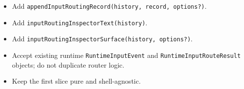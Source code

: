 \begin{itemize}
\tightlist
\item
  Add \texttt{a\allowbreak{}p\allowbreak{}p\allowbreak{}e\allowbreak{}n\allowbreak{}d\allowbreak{}I\allowbreak{}n\allowbreak{}p\allowbreak{}u\allowbreak{}t\allowbreak{}R\allowbreak{}o\allowbreak{}u\allowbreak{}t\allowbreak{}i\allowbreak{}n\allowbreak{}g\allowbreak{}R\allowbreak{}e\allowbreak{}c\allowbreak{}o\allowbreak{}r\allowbreak{}d\allowbreak{}(\allowbreak{}h\allowbreak{}i\allowbreak{}s\allowbreak{}t\allowbreak{}o\allowbreak{}r\allowbreak{}y\allowbreak{},\allowbreak{} \allowbreak{}r\allowbreak{}e\allowbreak{}c\allowbreak{}o\allowbreak{}r\allowbreak{}d\allowbreak{},\allowbreak{} \allowbreak{}o\allowbreak{}p\allowbreak{}t\allowbreak{}i\allowbreak{}o\allowbreak{}n\allowbreak{}s\allowbreak{}?\allowbreak{})}.
\item
  Add \texttt{i\allowbreak{}n\allowbreak{}p\allowbreak{}u\allowbreak{}t\allowbreak{}R\allowbreak{}o\allowbreak{}u\allowbreak{}t\allowbreak{}i\allowbreak{}n\allowbreak{}g\allowbreak{}I\allowbreak{}n\allowbreak{}s\allowbreak{}p\allowbreak{}e\allowbreak{}c\allowbreak{}t\allowbreak{}o\allowbreak{}r\allowbreak{}T\allowbreak{}e\allowbreak{}x\allowbreak{}t\allowbreak{}(\allowbreak{}h\allowbreak{}i\allowbreak{}s\allowbreak{}t\allowbreak{}o\allowbreak{}r\allowbreak{}y\allowbreak{})}.
\item
  Add \texttt{i\allowbreak{}n\allowbreak{}p\allowbreak{}u\allowbreak{}t\allowbreak{}R\allowbreak{}o\allowbreak{}u\allowbreak{}t\allowbreak{}i\allowbreak{}n\allowbreak{}g\allowbreak{}I\allowbreak{}n\allowbreak{}s\allowbreak{}p\allowbreak{}e\allowbreak{}c\allowbreak{}t\allowbreak{}o\allowbreak{}r\allowbreak{}S\allowbreak{}u\allowbreak{}r\allowbreak{}f\allowbreak{}a\allowbreak{}c\allowbreak{}e\allowbreak{}(\allowbreak{}h\allowbreak{}i\allowbreak{}s\allowbreak{}t\allowbreak{}o\allowbreak{}r\allowbreak{}y\allowbreak{},\allowbreak{} \allowbreak{}o\allowbreak{}p\allowbreak{}t\allowbreak{}i\allowbreak{}o\allowbreak{}n\allowbreak{}s\allowbreak{}?\allowbreak{})}.
\item
  Accept existing runtime \texttt{R\allowbreak{}u\allowbreak{}n\allowbreak{}t\allowbreak{}i\allowbreak{}m\allowbreak{}e\allowbreak{}I\allowbreak{}n\allowbreak{}p\allowbreak{}u\allowbreak{}t\allowbreak{}E\allowbreak{}v\allowbreak{}e\allowbreak{}n\allowbreak{}t} and \texttt{R\allowbreak{}u\allowbreak{}n\allowbreak{}t\allowbreak{}i\allowbreak{}m\allowbreak{}e\allowbreak{}I\allowbreak{}n\allowbreak{}p\allowbreak{}u\allowbreak{}t\allowbreak{}R\allowbreak{}o\allowbreak{}u\allowbreak{}t\allowbreak{}e\allowbreak{}R\allowbreak{}e\allowbreak{}s\allowbreak{}u\allowbreak{}l\allowbreak{}t} objects; do not duplicate router logic.
\item
  Keep the first slice pure and shell-agnostic.
\end{itemize}

